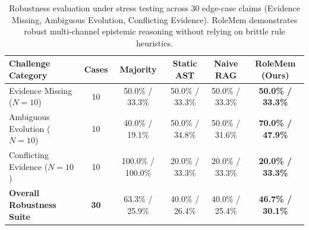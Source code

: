 \begin{table}[t]
\centering
\small
\begin{tabular}{lccccc}
\toprule
\textbf{Challenge Category} & \textbf{Cases} & \textbf{Majority} & \textbf{Static AST} & \textbf{Naive RAG} & \textbf{RoleMem (Ours)} \\
\midrule
Evidence Missing ($N=10$) & 10 & 50.0\% / 33.3\% & 50.0\% / 33.3\% & 50.0\% / 33.3\% & \textbf{50.0\% / 33.3\%} \\
Ambiguous Evolution ($N=10$) & 10 & 40.0\% / 19.1\% & 50.0\% / 34.8\% & 50.0\% / 31.6\% & \textbf{70.0\% / 47.9\%} \\
Conflicting Evidence ($N=10$) & 10 & 100.0\% / 100.0\% & 20.0\% / 33.3\% & 20.0\% / 33.3\% & \textbf{20.0\% / 33.3\%} \\
\midrule
\textbf{Overall Robustness Suite} & \textbf{30} & 63.3\% / 25.9\% & 40.0\% / 26.4\% & 40.0\% / 25.4\% & \textbf{46.7\% / 30.1\%} \\
\bottomrule
\end{tabular}
\caption{Robustness evaluation under stress testing across 30 edge-case claims (Evidence Missing, Ambiguous Evolution, Conflicting Evidence). RoleMem demonstrates robust multi-channel epistemic reasoning without relying on brittle rule heuristics.}
\label{tab:robustness_suite}
\end{table}